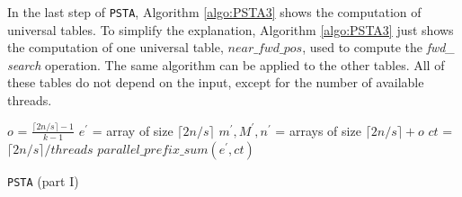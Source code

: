 In the last step of {\tt PSTA}, Algorithm \ref{algo:PSTA3} shows the computation of
universal tables. To simplify the explanation, Algorithm
\ref{algo:PSTA3} just shows the computation of one universal table,
$near\_fwd\_pos$, used to compute the \emph{fwd\_ search} operation. The same algorithm can be applied to the other
tables. All of these tables do not depend on the input, except for the
number of available threads.
\begin{minipage}[t]{.50\textwidth}
  \vspace{0pt}  
  \begin{algorithm}[H]
\small
\SetVlineSkip{-2cm}
  \LinesNumbered
  \SetAlgoNoEnd
  \DontPrintSemicolon
  \BlankLine%
  $o$ = $\frac{\lceil 2n/s \rceil-1}{k-1}$\;
  $e^{\prime}$ = array of size $\lceil 2n/s \rceil$\;
  $m^{\prime}, M^{\prime}, n^{\prime}$ = arrays of size $\lceil 2n/s \rceil + o$\;
  $ct$ = $\lceil 2n/s \rceil/threads$\;%
  \BlankLine
  $parallel\_prefix\_sum(e^{\prime}, ct)$\;
  \BlankLine
  \caption{{\tt PSTA} (part I)}
  \label{algo:PSTA1}
  \end{algorithm}
\end{minipage}%
